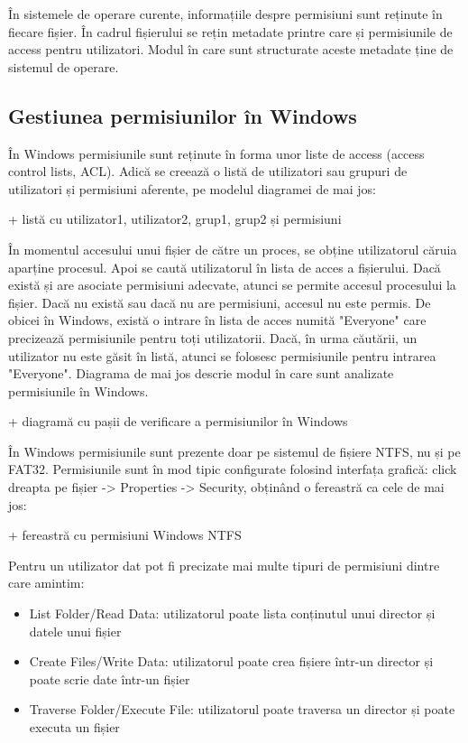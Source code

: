 În sistemele de operare curente, informațiile despre permisiuni sunt reținute în
fiecare fișier. În cadrul fișierului se rețin metadate printre care și
permisiunile de access pentru utilizatori. Modul în care sunt structurate aceste
metadate ține de sistemul de operare.

\subsection{Gestiunea permisiunilor în Windows}
\label{sec:users-fs-perms-windows}


În Windows permisiunile sunt reținute în forma unor liste de access (access
control lists, ACL). Adică se creează o listă de utilizatori sau grupuri de
utilizatori și permisiuni aferente, pe modelul diagramei de mai jos:

+ listă cu utilizator1, utilizator2, grup1, grup2 și permisiuni

În momentul accesului unui fișier de către un proces, se obține utilizatorul
căruia aparține procesul. Apoi se caută utilizatorul în lista de acces a
fișierului. Dacă există și are asociate permisiuni adecvate, atunci se permite
accesul procesului la fișier. Dacă nu există sau dacă nu are permisiuni, accesul
nu este permis. De obicei în Windows, există o intrare în lista de acces numită
"Everyone" care precizează permisiunile pentru toți utilizatorii. Dacă, în urma
căutării, un utilizator nu este găsit în listă, atunci se folosesc permisiunile
pentru intrarea "Everyone". Diagrama de mai jos descrie modul în care sunt
analizate permisiunile în Windows.

+ diagramă cu pașii de verificare a permisiunilor în Windows

În Windows permisiunile sunt prezente doar pe sistemul de fișiere NTFS, nu și pe
FAT32. Permisiunile sunt în mod tipic configurate folosind interfața grafică:
click dreapta pe fișier -> Properties -> Security, obținând o fereastră ca cele
de mai jos:

+ fereastră cu permisiuni Windows NTFS

Pentru un utilizator dat pot fi precizate mai multe tipuri de permisiuni dintre
care amintim:

\begin{itemize}
	\item List Folder/Read Data: utilizatorul poate lista conținutul unui
		director și datele unui fișier
	\item Create Files/Write Data: utilizatorul poate crea fișiere într-un
		director și poate scrie date într-un fișier
	\item Traverse Folder/Execute File: utilizatorul poate traversa un
		director și poate executa un fișier
\end{itemize}

